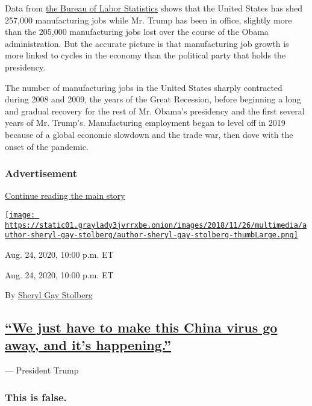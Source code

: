 Data from
\href{https://slack-redir.net/link?url=https\%3A\%2F\%2Fwww.bls.gov\%2Fiag\%2Ftgs\%2Fiag31-33.htm}{the
Bureau of Labor Statistics} shows that the United States has shed
257,000 manufacturing jobs while Mr. Trump has been in office, slightly
more than the 205,000 manufacturing jobs lost over the course of the
Obama administration. But the accurate picture is that manufacturing job
growth is more linked to cycles in the economy than the political party
that holds the presidency.

The number of manufacturing jobs in the United States sharply contracted
during 2008 and 2009, the years of the Great Recession, before beginning
a long and gradual recovery for the rest of Mr. Obama's presidency and
the first several years of Mr. Trump's. Manufacturing employment began
to level off in 2019 because of a global economic slowdown and the trade
war, then dove with the onset of the pandemic.

\hypertarget{advertisement-5}{%
\subsubsection{Advertisement}\label{advertisement-5}}

\protect\hyperlink{after-dfp-ad-mid6}{Continue reading the main story}

\href{https://www.nytimes3xbfgragh.onion/by/sheryl-gay-stolberg}{\texttt{[image: https://static01.graylady3jvrrxbe.onion/images/2018/11/26/multimedia/author-sheryl-gay-stolberg/author-sheryl-gay-stolberg-thumbLarge.png]}}

Aug. 24, 2020, 10:00 p.m. ET

Aug. 24, 2020, 10:00 p.m. ET

By
\href{https://www.nytimes3xbfgragh.onion/by/sheryl-gay-stolberg}{Sheryl
Gay Stolberg}

\hypertarget{we-just-have-to-make-this-china-virus-go-away-and-its-happening}{%
\subsection{\texorpdfstring{\protect\hyperlink{we-just-have-to-make-this-china-virus-go-away-and-its-happening}{``We
just have to make this China virus go away, and it's
happening.''}}{``We just have to make this China virus go away, and it's happening.''}}\label{we-just-have-to-make-this-china-virus-go-away-and-its-happening}}

--- President Trump

\hypertarget{this-is-false--1}{%
\subsubsection{This is false. }\label{this-is-false--1}}

